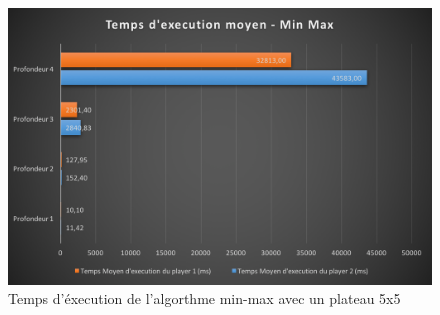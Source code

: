 \documentclass{report}
\begin{document}
	\begin{figure}[!t]
    	    \caption{Temps d'éxecution de l'algorthme min-max avec un plateau 5x5}
    	    \label{TEAMM5x5}
    	    \includegraphics[scale=0.40]{tempsExecutionMinMax5x5.png}
    	\end{figure}
\end{document}
